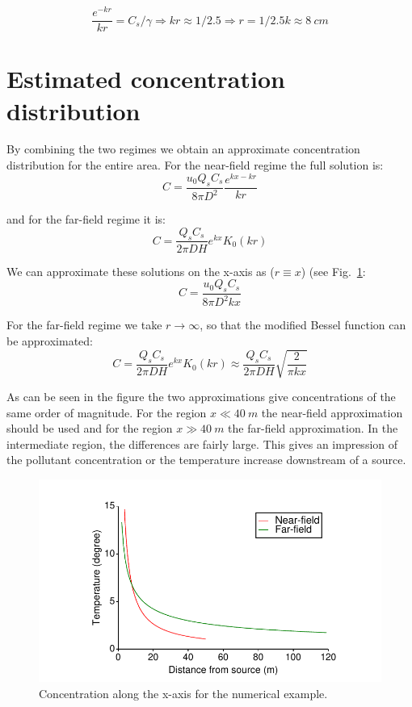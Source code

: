 \documentclass[onecolumn]{article}
\begin{document}
\begin{equation}
\frac{e^{-kr}}{kr} = C_s / \gamma \Rightarrow kr \approx 1/2.5 \Rightarrow r = 1/2.5k \approx 8~cm
\end{equation}


\section*{Estimated concentration distribution}
By combining the two regimes we obtain an approximate concentration distribution for the entire
area. For the near-field regime the full solution is:
\begin{equation}
C = \frac{u_0 Q_s C_s}{8 \pi D^2} \frac{e^{kx - kr}}{kr}
\end{equation}

\noindent and for the far-field regime it is:
\begin{equation}
C = \frac{Q_s C_s}{2 \pi D H} e^{kx} K_0(kr)
\end{equation}

We can approximate these solutions on the x-axis as (\(r \equiv x\)) (see Fig.\ \ref{graph_xaxis}:
\begin{equation}
C = \frac{u_0 Q_s C_s}{8 \pi D^2 kx}
\end{equation}

For the far-field regime we take \(r \rightarrow \infty\), so that the modified Bessel function
can be approximated:
\begin{equation}
C = \frac{Q_s C_s}{2 \pi D H} e^{kx} K_0(kr) \approx \frac{Q_s C_s}{2 \pi D H} \sqrt{ \frac{2}{\pi k x}}
\end{equation}

As can be seen in the figure the two approximations give concentrations of the same order of magnitude.
For the region \(x \ll 40~m\) the near-field approximation should be used and for the region \(x \gg 40~m\)
the far-field approximation. In the intermediate region, the differences are fairly large. This
gives an impression of the pollutant concentration or the temperature increase downstream of a source.

\begin{figure}
\begin{center}
\includegraphics{graph_xaxis.pdf}
\caption{Concentration along the x-axis for the numerical example.}
\label{graph_xaxis}
\end{center}
\end{figure}
\end{document}
